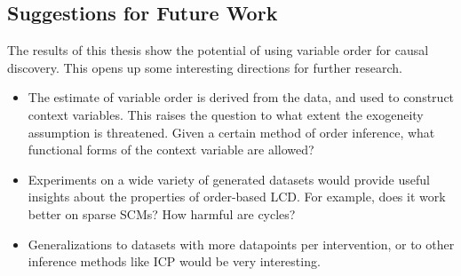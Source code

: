 \subsection{Suggestions for Future Work}
The results of this thesis show the potential of using variable order for causal discovery. This opens up some interesting directions for further research.

\begin{itemize}
    \item The estimate of variable order is derived from the data, and used to construct context variables. This raises the question to what extent the exogeneity assumption is threatened. Given a certain method of order inference, what functional forms of the context variable are allowed?
    \item Experiments on a wide variety of generated datasets would provide useful insights about the properties of order-based LCD. For example, does it work better on sparse SCMs? How harmful are cycles?
    \item Generalizations to datasets with more datapoints per intervention, or to other inference methods like ICP would be very interesting. 
\end{itemize}



